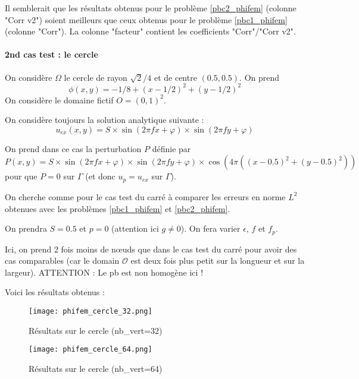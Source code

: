 Il semblerait que les résultats obtenus pour le problème \ref{pbc2_phifem} (colonne "Corr v2") soient meilleurs que ceux obtenus pour le problème \ref{pbc1_phifem} (colonne "Corr"). La colonne "facteur" contient les coefficients "Corr"/"Corr v2".

\paragraph*{2nd cas test : le cercle \\}

On considère $\Omega$ le cercle de rayon $\sqrt{2}/4$ et de centre $(0.5,0.5)$. On prend 
$$\phi(x,y)=-1/8+(x-1/2)^2+(y-1/2)^2$$
On considère le domaine fictif $O=(0,1)^2$.

On considère toujours la solution analytique suivante :
$$u_{ex}(x,y) = S\times\sin(2\pi fx + \varphi)\times\sin(2\pi fy + \varphi)$$ 

On prend dans ce cas la perturbation $P$ définie par
$$P(x,y) = S\times\sin(2\pi fx + \varphi)\times\sin(2\pi fy + \varphi)\times\cos(4\pi((x-0.5)^2+(y-0.5)^2))$$ 
pour que $P=0$ sur $\Gamma$ (et donc $u_p=u_{ex}$ sur $\Gamma$). 

On cherche comme pour le cas test du carré à comparer les erreurs en norme $L^2$ obtenues avec les problèmes \ref{pbc1_phifem} et \ref{pbc2_phifem}.

On prendra $S=0.5$ et $p=0$ (attention ici $g\ne 0$). On fera varier $\epsilon$, $f$ et $f_p$. 

\begin{Rem}
	Ici, on prend 2 fois moins de nœuds que dans le cas test du carré pour avoir des cas comparables (car le domain $\mathcal{O}$ est deux fois plus petit sur la longueur et sur la largeur). ATTENTION : Le pb est non homogène ici !
\end{Rem}

Voici les résultats obtenus :

\begin{minipage}{0.48\linewidth}
	\begin{figure}[H]
		\centering
		\texttt{[image: phifem\_cercle\_32.png]}
		\caption{Résultats sur le cercle (nb\_vert=32)}
	\end{figure}
\end{minipage}
\begin{minipage}{0.48\linewidth}
	\begin{figure}[H]
		\centering
		\texttt{[image: phifem\_cercle\_64.png]}
		\caption{Résultats sur le cercle (nb\_vert=64)}
	\end{figure}
\end{minipage}

